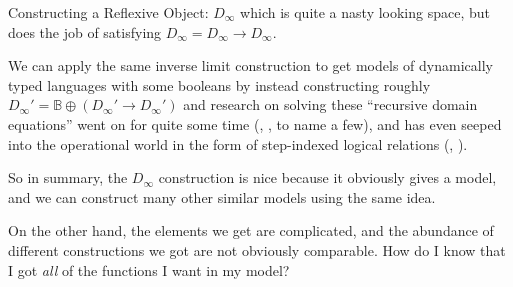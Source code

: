 \documentclass{article}
\newcommand{\dinfty}{D_{\infty}}
\begin{document}
\begin{section}{Constructing a Reflexive Object: $D_{\infty}$}
  which is quite a nasty looking space, but does the job of satisfying
  $\dinfty = \dinfty \to \dinfty$.

  We can apply the same inverse limit construction to get models of
  dynamically typed languages with some booleans by instead
  constructing roughly
  $\dinfty' = \mathbb{B} \oplus (\dinfty' \to \dinfty')$ and research
  on solving these ``recursive domain equations'' went on for quite
  some time (\cite{wand1979fixed},
  \cite{smyth1982category},\cite{pitts1996relational} to name a few),
  and has even seeped into the operational world in the form of
  step-indexed logical relations (\cite{appel2001indexed},
  \cite{ahmed2004semantics}).

  So in summary, the $\dinfty$ construction is nice because it
  obviously gives a model, and we can construct many other similar
  models using the same idea.

  On the other hand, the elements we get are complicated, and the
  abundance of different constructions we got are not obviously
  comparable. How do I know that I got \emph{all} of the functions I
  want in my model?  
\end{section}
\end{document}
